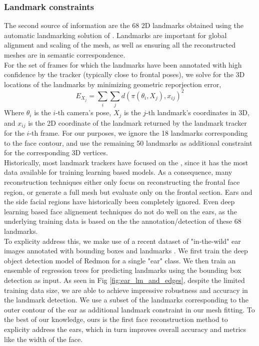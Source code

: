 \documentclass[10pt,twocolumn,letterpaper]{article}
\begin{document}
 
 \subsubsection{Landmark constraints}

 The second source of information are the 68 2D landmarks obtained using the automatic landmarking solution of \cite{baltrusaitis2018openface}. Landmarks are important for global alignment and scaling of the mesh, as well as ensuring all the reconstructed meshes are in semantic correspondence.\\
 For the set of frames for which the landmarks have been annotated with high confidence by the tracker (typically close to frontal poses), we solve for the 3D locations of the landmarks by minimizing geometric reporjection error, 
 \begin{equation}
    E_{X_{j}} = \sum_{i} \sum_{j} d(\pi (\theta_{i},X_{j}),x_{ij})^2
\end{equation}
Where $\theta_i$ is the $i$-th camera's pose, $X_{j}$ is the $j$-th landmark's coordinates in 3D, and $x_{ij}$ is the 2D coordinate of the landmark returned by the landmark tracker for the $i$-th frame. For our purposes, we ignore the 18 landmarks corresponding to the face contour, and use the remaining 50 landmarks as additional constraint for the corresponding 3D vertices.\\


Historically, most landmark trackers have focused on the , since it has the most data available for training learning based models. As a consequence, many reconstruction techniques either only focus on reconstructing the frontal face region, or generate a full mesh but evaluate only on the frontal section. Ears and the side facial regions have historically been completely ignored. Even deep learning based face alignement techniques do not do well on the ears, as the underlying training data is based on the the annotation/detection of these 68 landmarks.\\

To explicity address this, we make use of a recent dataset of "in-the-wild" ear images annotated with bounding boxes and landmarks \cite{zhou2017deformable}. We first train the deep object detection model of Redmon \etal \cite{redmon2017yolo9000} for a single "ear" class. We then train an ensemble of regression trees \cite{kazemi2014one} for predicting landmarks using the bounding box detection as input. As seen in Fig \ref{fig:ear_lm_and_edges}, despite the limited training data size, we are able to achieve impressive robustness and accuracy in the landmark detection. We use a subset of the landmarks corresponding to the outer contour of the ear as additional landmark constraint in our mesh fitting.
To the best of our knowledge, ours is the first face reconstruction method to explicity address the ears, which in turn improves overall accuracy and metrics like the width of the face.
\end{document}

